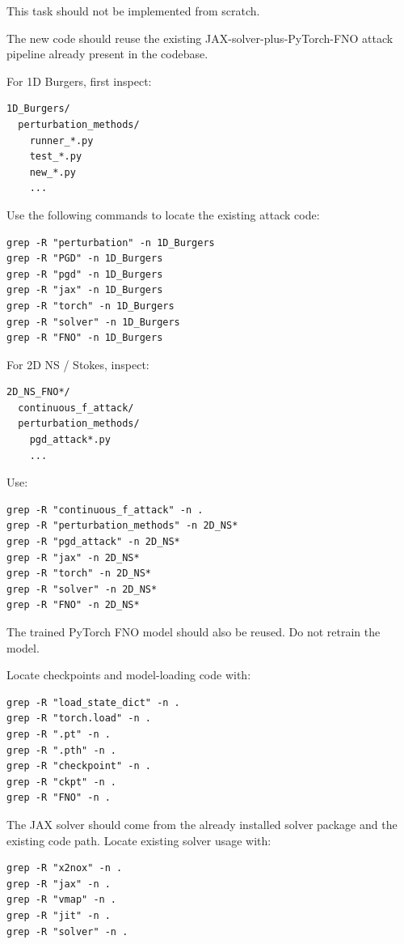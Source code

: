 \documentclass{article}
\begin{document}
This task should not be implemented from scratch.

The new code should reuse the existing JAX-solver-plus-PyTorch-FNO attack pipeline already present in the codebase.

For 1D Burgers, first inspect:

\begin{verbatim}
1D_Burgers/
  perturbation_methods/
    runner_*.py
    test_*.py
    new_*.py
    ...
\end{verbatim}

Use the following commands to locate the existing attack code:

\begin{verbatim}
grep -R "perturbation" -n 1D_Burgers
grep -R "PGD" -n 1D_Burgers
grep -R "pgd" -n 1D_Burgers
grep -R "jax" -n 1D_Burgers
grep -R "torch" -n 1D_Burgers
grep -R "solver" -n 1D_Burgers
grep -R "FNO" -n 1D_Burgers
\end{verbatim}

For 2D NS / Stokes, inspect:

\begin{verbatim}
2D_NS_FNO*/
  continuous_f_attack/
  perturbation_methods/
    pgd_attack*.py
    ...
\end{verbatim}

Use:

\begin{verbatim}
grep -R "continuous_f_attack" -n .
grep -R "perturbation_methods" -n 2D_NS*
grep -R "pgd_attack" -n 2D_NS*
grep -R "jax" -n 2D_NS*
grep -R "torch" -n 2D_NS*
grep -R "solver" -n 2D_NS*
grep -R "FNO" -n 2D_NS*
\end{verbatim}

The trained PyTorch FNO model should also be reused. Do not retrain the model.

Locate checkpoints and model-loading code with:

\begin{verbatim}
grep -R "load_state_dict" -n .
grep -R "torch.load" -n .
grep -R ".pt" -n .
grep -R ".pth" -n .
grep -R "checkpoint" -n .
grep -R "ckpt" -n .
grep -R "FNO" -n .
\end{verbatim}

The JAX solver should come from the already installed solver package and the existing code path. Locate existing solver usage with:

\begin{verbatim}
grep -R "x2nox" -n .
grep -R "jax" -n .
grep -R "vmap" -n .
grep -R "jit" -n .
grep -R "solver" -n .
\end{verbatim}
\end{document}
